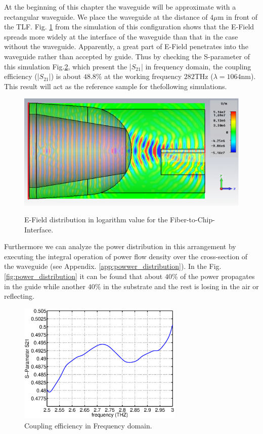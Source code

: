 At the beginning of this chapter the waveguide will be approximate with a rectangular waveguide. We place the waveguide at the distance of $4\mu$m in front of the TLF.  Fig. \ref{fig:coupling_e_field} from the simulation of this configuration shows that the E-Field spreads more widely at the interface of the waveguide than that in the case without the waveguide. Apparently, a great part of E-Field penetrates into the waveguide rather than accepted by guide. Thus by checking the S-parameter of this simulation Fig.\ref{fig:orignial_coupling_efficiency}, which present the |$S_{21}$| in frequency domain, the coupling efficiency (|$S_{21}$|) is about $48.8\%$ at the working frequency $282$THz ($\lambda=1064$nm). This result will act as the reference sample for thefollowing simulations.\\ 
\begin{figure}[!ht]
\centering
	\includegraphics[width=0.7 \textwidth]{bilder/cst_basic_waveguide_efield}
	\label{fig:coupling_e_field}
	\caption{E-Field distribution in logarithm value for the Fiber-to-Chip-Interface.}
\end{figure}
Furthermore we can analyze the power distribution in this arrangement by executing the integral operation of power flow density over the cross-section of the waveguide (see Appendix. \ref{app:powwer_distribution}).  In the Fig. \ref{fig:power_distribution} it can be found that about $40\%$ of the power propagates in the guide while another $40\%$ in the substrate and the rest is losing in the air or reflecting.
\begin{figure}
\centering
\includegraphics[width=0.7\textwidth]{bilder/original_coupling_efficiency}
\caption{Coupling efficiency in Frequency domain.}
\label{fig:orignial_coupling_efficiency}
\end{figure}
